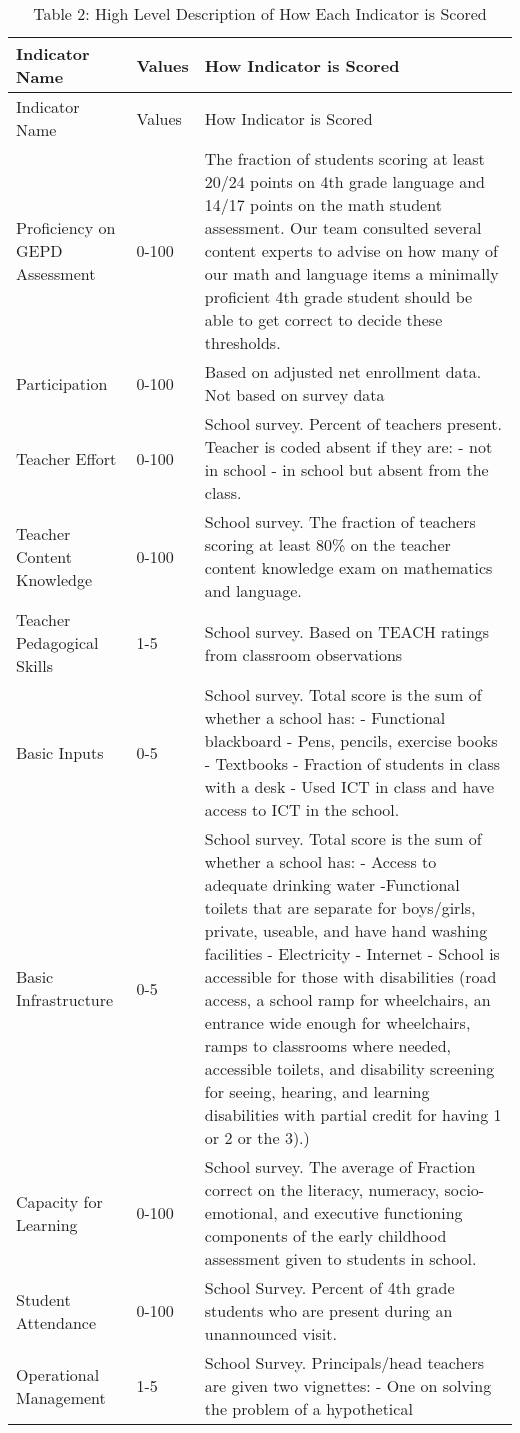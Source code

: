 \documentclass[]{article}
\begin{document}
\begin{longtable}[]{@{}lll@{}}
\caption{Table 2: High Level Description of How Each Indicator is
Scored}\tabularnewline
\toprule
Indicator Name & Values & How Indicator is Scored\tabularnewline
\midrule
\endfirsthead
\toprule
Indicator Name & Values & How Indicator is Scored\tabularnewline
\midrule
\endhead
Proficiency on GEPD Assessment & 0-100 & The fraction of students
scoring at least 20/24 points on 4th grade language and 14/17 points on
the math student assessment. Our team consulted several content experts
to advise on how many of our math and language items a minimally
proficient 4th grade student should be able to get correct to decide
these thresholds.\tabularnewline
Participation & 0-100 & Based on adjusted net enrollment data. Not based
on survey data\tabularnewline
Teacher Effort & 0-100 & School survey. Percent of teachers present.
Teacher is coded absent if they are: - not in school - in school but
absent from the class.\tabularnewline
Teacher Content Knowledge & 0-100 & School survey. The fraction of
teachers scoring at least 80\% on the teacher content knowledge exam on
mathematics and language.\tabularnewline
Teacher Pedagogical Skills & 1-5 & School survey. Based on TEACH ratings
from classroom observations\tabularnewline
Basic Inputs & 0-5 & School survey. Total score is the sum of whether a
school has: - Functional blackboard - Pens, pencils, exercise books -
Textbooks - Fraction of students in class with a desk - Used ICT in
class and have access to ICT in the school.\tabularnewline
Basic Infrastructure & 0-5 & School survey. Total score is the sum of
whether a school has: - Access to adequate drinking water -Functional
toilets that are separate for boys/girls, private, useable, and have
hand washing facilities - Electricity - Internet - School is accessible
for those with disabilities (road access, a school ramp for wheelchairs,
an entrance wide enough for wheelchairs, ramps to classrooms where
needed, accessible toilets, and disability screening for seeing,
hearing, and learning disabilities with partial credit for having 1 or 2
or the 3).)\tabularnewline
Capacity for Learning & 0-100 & School survey. The average of Fraction
correct on the literacy, numeracy, socio-emotional, and executive
functioning components of the early childhood assessment given to
students in school.\tabularnewline
Student Attendance & 0-100 & School Survey. Percent of 4th grade
students who are present during an unannounced visit.\tabularnewline
Operational Management & 1-5 & School Survey. Principals/head teachers
are given two vignettes: - One on solving the problem of a hypothetical

\end{longtable}
\end{document}
